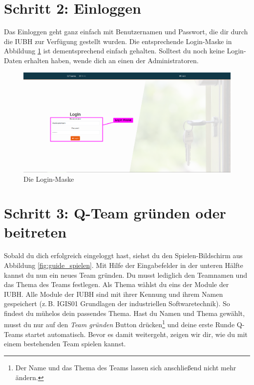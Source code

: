 \documentclass[a4paper,11pt,listof=numbered,glossary=totoc,parskip=half,toc=bib]{scrreprt}
\newcommand{\zB}{\mbox{z.\,B.}\xspace}
\begin{document}
\begin{appendices}
	\section*{Schritt 2: Einloggen}
	
	Das Einloggen geht ganz einfach mit Benutzernamen und Passwort, die dir durch die IUBH zur Verfügung gestellt wurden. Die entsprechende Login-Maske in Abbildung \ref{fig:guide_login} ist dementsprechend einfach gehalten. Solltest du noch keine Login-Daten erhalten haben, wende dich an einen der Administratoren.
	
	\begin{figure}[h!]
		\centering
		\includegraphics[width=\textwidth]{UserGuide/Login.png}
		\caption{Die Login-Maske}
		\label{fig:guide_login}
	\end{figure}
	
	\newpage
	\section*{Schritt 3: Q-Team gründen oder beitreten}
	
	Sobald du dich erfolgreich eingeloggt hast, siehst du den Spielen-Bildschirm aus Abbildung \ref{fig:guide_spielen}. Mit Hilfe der Eingabefelder in der unteren Hälfte kannst du nun ein neues Team gründen. Du musst lediglich den Teamnamen und das Thema des Teams festlegen. Als Thema wählst du eins der Module der IUBH. Alle Module der IUBH sind mit ihrer Kennung und ihrem Namen gespeichert (\zB IGIS01 Grundlagen der industriellen Softwaretechnik). So findest du mühelos dein passendes Thema. Hast du Namen und Thema gewählt, musst du nur auf den \textit{Team gründen} Button drücken\footnote{Der Name und das Thema des Teams lassen sich anschließend nicht mehr ändern.} und deine erste Runde Q-Teams startet automatisch. Bevor es damit weitergeht, zeigen wir dir, wie du mit einem bestehenden Team spielen kannst.
	

\end{appendices}
\end{document}
